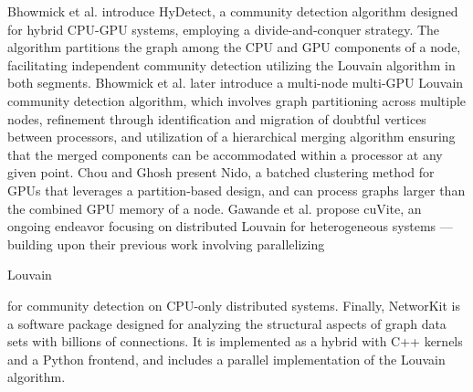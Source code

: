 Bhowmick et al. \cite{com-bhowmik19} introduce HyDetect, a community detection algorithm designed for hybrid CPU-GPU systems, employing a divide-and-conquer strategy. The algorithm partitions the graph among the CPU and GPU components of a node, facilitating independent community detection utilizing the Louvain algorithm in both segments. Bhowmick et al. \cite{com-bhowmick22} later introduce a multi-node multi-GPU Louvain community detection algorithm, which involves graph partitioning across multiple nodes, refinement through identification and migration of doubtful vertices between processors, and utilization of a hierarchical merging algorithm ensuring that the merged components can be accommodated within a processor at any given point. Chou and Ghosh \cite{chou2022batched} present Nido, a batched clustering method for GPUs that leverages a partition-based design, and can process graphs larger than the combined GPU memory of a node. Gawande et al. \cite{com-gawande22} propose cuVite, an ongoing endeavor focusing on distributed Louvain for heterogeneous systems --- building upon their previous work involving parallelizing Louvain for community detection on CPU-only distributed systems. Finally, NetworKit \cite{staudt2016networkit} is a software package designed for analyzing the structural aspects of graph data sets with billions of connections. It is implemented as a hybrid with C++ kernels and a Python frontend, and includes a parallel implementation of the Louvain algorithm.


